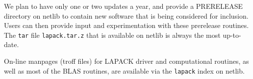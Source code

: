 We plan to have only one or two updates a year, and provide a PRERELEASE
directory on netlib to contain new software that is being considered for
inclusion.  Users can then provide input and experimentation with these
prerelease routines.  The {\tt tar} file {\tt lapack.tar.z} that is
available on netlib is always the most up-to-date.

On-line manpages (troff files) for LAPACK driver and computational
routines, as well as most of the BLAS routines, are available via 
the {\tt lapack} index on netlib.


